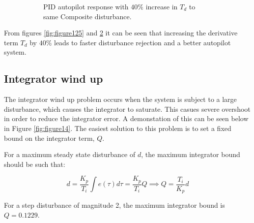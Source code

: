 \documentclass[8pt]{article}
\begin{document}
\begin{figure}[H]
\begin{subfigure}[t]{0.48\textwidth}
        \caption{PID autopilot response with $40\%$ increase in $T_d$ to same Composite disturbance.}
        \label{fig:figure13}
    \end{subfigure}
    \caption{}
\end{figure}

From figures \ref{fig:figure125} and \ref{fig:figure13} it can be seen that increasing the derivative term $T_d$ by $40\%$ leads to faster disturbance rejection and a better autopilot system.

\subsection{Integrator wind up}

The integrator wind up problem occurs when the system is subject to a large disturbance, which causes the integrator to saturate.
This casues severe overshoot in order to reduce the integrator error.
A demonstation of this can be seen below in Figure \ref{fig:figure14}.
The easiest solution to this problem is to set a fixed bound on the integrator term, $Q$.

For a maximum steady state disturbance of $d$, the maximum integrator bound should be such that:

\begin{equation}
    d = \frac{K_p}{T_i}\int e(\tau)d\tau = \frac{K_p}{T_i}Q \implies Q = \frac{T_i}{K_p}d
\end{equation}

For a step disturbance of magnitude 2, the maximum integrator bound is $Q=0.1229$.
\end{document}
